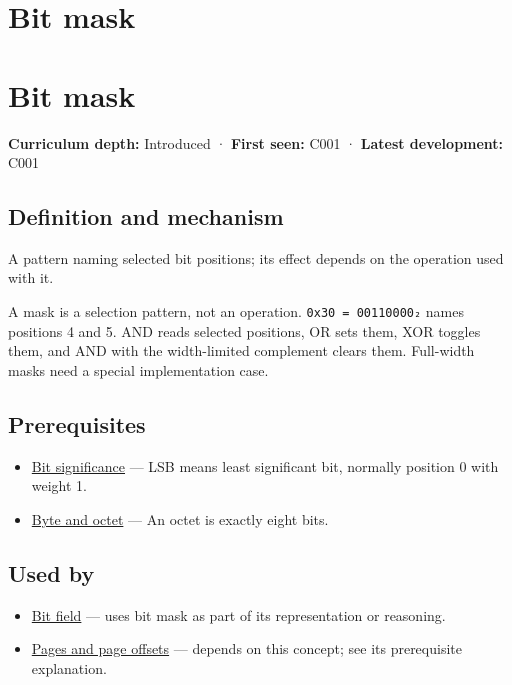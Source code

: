 \hypertarget{appendix-dbe5905163c2}{}
\section*{Bit mask}
\section{Bit mask}\label{bit-mask}

\textbf{Curriculum depth:} Introduced · \textbf{First seen:} C001 · \textbf{Latest development:} C001

\subsection{Definition and mechanism}\label{definition-and-mechanism}

A pattern naming selected bit positions; its effect depends on the operation used with it.

A mask is a selection pattern, not an operation. \texttt{0x30\ =\ 00110000₂} names positions 4 and 5. AND reads selected positions, OR sets them, XOR toggles them, and AND with the width-limited complement clears them. Full-width masks need a special implementation case.

\subsection{Prerequisites}\label{prerequisites}

\begin{itemize}
\tightlist
\item
  \hyperref[appendix-280445746493]{Bit significance} --- LSB means least significant bit, normally position 0 with weight 1.
\item
  \hyperref[appendix-5bee2df85484]{Byte and octet} --- An octet is exactly eight bits.
\end{itemize}

\subsection{Used by}\label{used-by}

\begin{itemize}
\item
  \hyperref[appendix-ac697f5c66e8]{Bit field} --- uses bit mask as part of its representation or reasoning.
\item
  \hyperref[appendix-0c67cd5bf30a]{Pages and page offsets} --- depends on this concept; see its prerequisite explanation.
\end{itemize}

